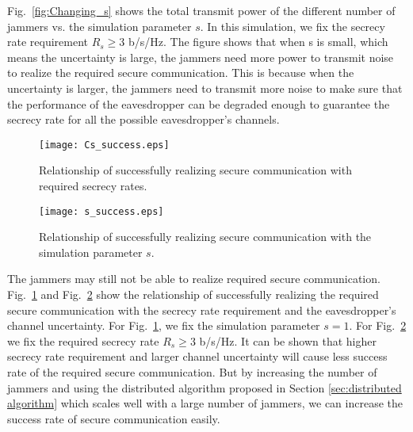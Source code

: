 \documentclass[12pt, journal,onecolumn,draftclsnofoot]{IEEEtran}
\begin{document}
Fig.~\ref{fig:Changing_s} shows the total transmit power of the different number of jammers vs. the simulation parameter $s$. In this simulation, we fix the secrecy rate requirement $R_s \geq 3 $ b/s/Hz. The figure shows that when s is small, which means the uncertainty is large, the jammers need more power to transmit noise to realize the required secure communication. This is because when the uncertainty is larger, the jammers need to transmit more noise to make sure that the performance of the eavesdropper can be degraded enough to guarantee the secrecy rate for all the possible eavesdropper's channels.

\begin{figure}[!ht]
	\centering
	\texttt{[image: Cs\_success.eps]} %
	\caption{Relationship of successfully realizing secure communication with required secrecy rates.}
	\label{fig:Cs_success}
\end{figure}
\begin{figure}[!ht]
	\centering
	\texttt{[image: s\_success.eps]} %
	\caption{Relationship of successfully realizing secure communication with the simulation parameter $s$.}
	\label{fig:s_success}
\end{figure}

The jammers may still not be able to realize required secure communication. Fig.~\ref{fig:Cs_success} and Fig.~\ref{fig:s_success} show the relationship of successfully realizing the required secure communication with the secrecy rate requirement and the eavesdropper's channel uncertainty. For Fig.~\ref{fig:Cs_success}, we fix the simulation parameter $s = 1$. For Fig.~\ref{fig:s_success} we fix the required secrecy rate $R_s \geq 3$ b/s/Hz. It can be shown that higher secrecy rate requirement and larger channel uncertainty will cause less success rate of the required secure communication. But by increasing the number of jammers and using the distributed algorithm proposed in Section \ref{sec:distributed algorithm} which scales well with a large number of jammers, we can increase the success rate of secure communication easily. 

%
%
\end{document}
